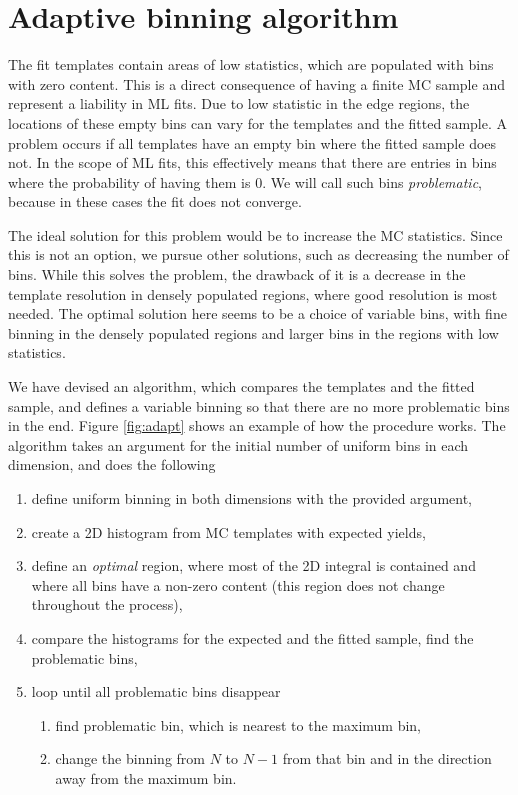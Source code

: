 \section{Adaptive binning algorithm}\label{sec:adaptive-binning-algorithm}

The fit templates contain areas of low statistics, which are populated with bins with zero content. This is a direct consequence of having a finite MC sample and represent a liability in ML fits. Due to low statistic in the edge regions, the locations of these empty bins can vary for the templates and the fitted sample. A problem occurs if all templates have an empty bin where the fitted sample does not. In the scope of ML fits, this effectively means that there are entries in bins where the probability of having them is $0$. We will call such bins \textit{problematic}, because in these cases the fit does not converge.

The ideal solution for this problem would be to increase the MC statistics. Since this is not an option, we pursue other solutions, such as decreasing the number of bins. While this solves the problem, the drawback of it is a decrease in the template resolution in densely populated regions, where good resolution is most needed. The optimal solution here seems to be a choice of variable bins, with fine binning in the densely populated regions and larger bins in the regions with low statistics.

We have devised an algorithm, which compares the templates and the fitted sample, and defines a variable binning so that there are no more problematic bins in the end. Figure \ref{fig:adapt} shows an example of how the procedure works. The algorithm takes an argument for the initial number of uniform bins in each dimension, and does the following
\begin{enumerate}
\item define uniform binning in both dimensions with the provided argument,
\item create a 2D histogram from MC templates with expected yields,
\item define an \textit{optimal} region, where most of the 2D integral is contained and where all bins have a non-zero content (this region does not change throughout the process),
\item compare the histograms for the expected and the fitted sample, find the problematic bins,
\item loop until all problematic bins disappear
	\begin{enumerate}
	\item find problematic bin, which is nearest to the maximum bin,
	\item change the binning from $N$ to $N-1$ from that bin and in the direction away from the maximum bin.
	\end{enumerate}
\end{enumerate}

